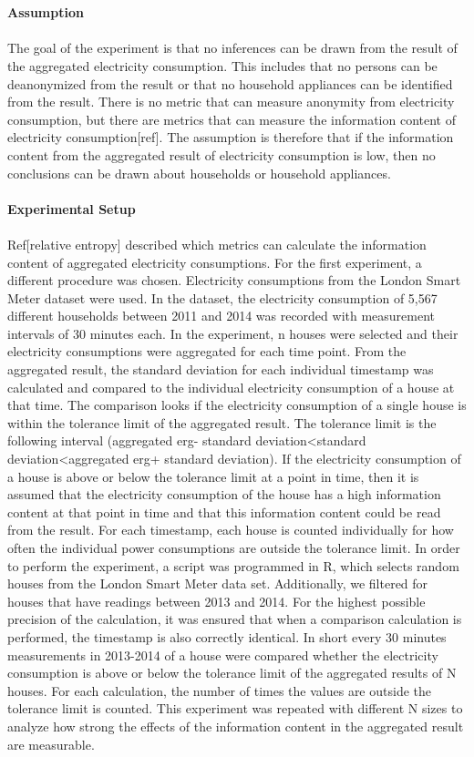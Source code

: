 \\
\\
\textbf{Assumption}
\\
\\
The goal of the experiment is that no inferences can be drawn from the result of the aggregated electricity consumption. This includes that no persons can be deanonymized from the result or that no household appliances can be identified from the result. There is no metric that can measure anonymity from electricity consumption, but there are metrics that can measure the information content of electricity consumption[ref]. The assumption is therefore that if the information content from the aggregated result of electricity consumption is low, then no conclusions can be drawn about households or household appliances.
\\
\\
\textbf{Experimental Setup}
\\
\\
Ref[relative entropy] described which metrics can calculate the information content of aggregated electricity consumptions. For the first experiment, a different procedure was chosen. Electricity consumptions from the London Smart Meter dataset were used. In the dataset, the electricity consumption of 5,567 different households between 2011 and 2014 was recorded with measurement intervals of 30 minutes each. In the experiment, n houses were selected and their electricity consumptions were aggregated for each time point. From the aggregated result, the standard deviation for each individual timestamp was calculated and compared to the individual electricity consumption of a house at that time. The comparison looks if the electricity consumption of a single house is within the tolerance limit of the aggregated result. The tolerance limit is the following interval (aggregated erg- standard deviation<standard deviation<aggregated erg+ standard deviation).  If the electricity consumption of a house is above or below the tolerance limit at a point in time, then it is assumed that the electricity consumption of the house has a high information content at that point in time and that this information content could be read from the result. For each timestamp, each house is counted individually for how often the individual power consumptions are outside the tolerance limit. In order to perform the experiment, a script was programmed in R, which selects random houses from the London Smart Meter data set. Additionally, we filtered for houses that have readings between 2013 and 2014. For the highest possible precision of the calculation, it was ensured that when a comparison calculation is performed, the timestamp is also correctly identical. In short every 30 minutes measurements in 2013-2014 of a house were compared whether the electricity consumption is above or below the tolerance limit of the aggregated results of N houses. For each calculation, the number of times the values are outside the tolerance limit is counted. This experiment was repeated with different N sizes to analyze how strong the effects of the information content in the aggregated result are measurable.\\
